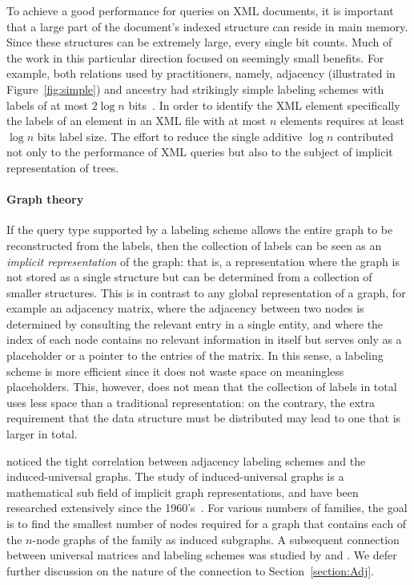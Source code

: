 To achieve a good performance for  queries on  XML documents, it is important  that a large  part of the document's indexed structure can reside in main memory. Since these structures can be extremely large, every single bit counts.
Much of the work in this particular direction focused on seemingly small benefits. For example, both relations used by practitioners, namely, adjacency (illustrated in Figure~\ref{fig:simple}) and ancestry  had strikingly simple  labeling schemes with labels of at most $2 \log n$ bits~\cite{Kannan92}.
In order to identify the XML element specifically the labels of an element  in an XML file with at most $n$ elements requires at  least  $\log n$ bits label size. 
The effort to reduce the single additive $\log n$ contributed  not only to the performance of XML queries but also to the subject of implicit representation of trees.

\paragraph{Graph theory}
If the query type supported by a labeling scheme allows the entire graph to be reconstructed from the labels, then the collection of labels can be seen as an \emph{implicit representation} of the graph: that is, a representation where the graph is not stored as a single structure but can be determined from a collection of smaller structures.
This is in contrast to any global representation of a graph, for example an adjacency matrix, where the adjacency between two nodes is determined by consulting the relevant entry in a single entity, and where the index of each node contains no relevant information in itself but serves only as a placeholder or a pointer to the entries of the matrix. 
In this sense, a labeling scheme is more efficient since it does not waste space on meaningless placeholders. This, however, does not mean that the collection of labels in total uses less space than a traditional representation: on the contrary, the extra requirement that the data structure must be distributed may lead to one that is  larger in total. 

 noticed the tight correlation between adjacency labeling schemes and the induced-universal graphs. The study of induced-universal graphs is  a mathematical sub field of implicit graph representations, and have been researched extensively since the 1960's~\cite{rado1964universal}. 
For various numbers of families, the goal is to find the smallest number of nodes required for a graph that contains each of the $n$-node graphs of the family  as induced subgraphs. 
 A subsequent connection between universal matrices and \distance labeling schemes was studied by  and .
We defer further discussion on the nature of the connection to Section~\ref{section:Adj}.

